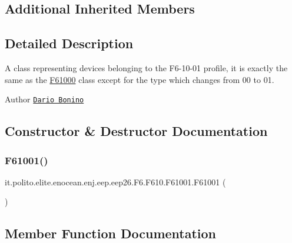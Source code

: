 \subsection*{Additional Inherited Members}


\subsection{Detailed Description}
A class representing devices belonging to the F6-\/10-\/01 profile, it is exactly the same as the \hyperlink{classit_1_1polito_1_1elite_1_1enocean_1_1enj_1_1eep_1_1eep26_1_1_f6_1_1_f610_1_1_f61000}{F61000} class except for the type which changes from 00 to 01.

\begin{DoxyAuthor}{Author}
\href{mailto:dario.bonino@gmail.com}{\tt Dario Bonino} 
\end{DoxyAuthor}


\subsection{Constructor \& Destructor Documentation}
\hypertarget{classit_1_1polito_1_1elite_1_1enocean_1_1enj_1_1eep_1_1eep26_1_1_f6_1_1_f610_1_1_f61001_aae3d5cbd22bc5abf43a42bb10436e71b}{}\label{classit_1_1polito_1_1elite_1_1enocean_1_1enj_1_1eep_1_1eep26_1_1_f6_1_1_f610_1_1_f61001_aae3d5cbd22bc5abf43a42bb10436e71b} 
\subsubsection{\texorpdfstring{F61001()}{F61001()}}
{\footnotesize\ttfamily it.\+polito.\+elite.\+enocean.\+enj.\+eep.\+eep26.\+F6.\+F610.\+F61001.\+F61001 (\begin{DoxyParamCaption}{ }\end{DoxyParamCaption})}



\subsection{Member Function Documentation}
\hypertarget{classit_1_1polito_1_1elite_1_1enocean_1_1enj_1_1eep_1_1eep26_1_1_f6_1_1_f610_1_1_f61001_a29d0bbbf483c15224d15ceabd099147e}{}\label{classit_1_1polito_1_1elite_1_1enocean_1_1enj_1_1eep_1_1eep26_1_1_f6_1_1_f610_1_1_f61001_a29d0bbbf483c15224d15ceabd099147e} 
